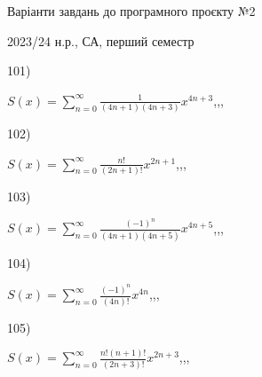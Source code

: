 \documentclass[11pt, ukrainian]{article}
\begin{document}
{\Large \center  Варіанти завдань до програмного проєкту №2\par 2023/24 н.р., СА, перший семестр\par \bigskip}

101) \space 
{%
{$S(x)=\sum\limits_{n=0}^{\infty}{\frac{1}{(4n+1)(4n+3)}}{x^{{4n+3}}}$},,, \par \smallskip  
}
\par
\vspace{0.9cm}
102) \space 
{%
{$S(x)=\sum\limits_{n=0}^{\infty}{\frac{n!}{(2n+1)!}}{x^{{2n+1}}}$},,, \par \smallskip  
}
\par
\vspace{0.9cm}
103) \space 
{%
{$S(x)=\sum\limits_{n=0}^{\infty}{\frac{(-1)^n}{(4n+1)(4n+5)}}{x^{{4n+5}}}$},,, \par \smallskip  
}
\par
\vspace{0.9cm}
104) \space 
{%
{$S(x)=\sum\limits_{n=0}^{\infty}{\frac{(-1)^n}{(4n)!}}{x^{{4n}}}$},,, \par \smallskip  
}
\par
\vspace{0.9cm}
105) \space 
{%
{$S(x)=\sum\limits_{n=0}^{\infty}{\frac{n!(n+1)!}{(2n+3)!}}{x^{{2n+3}}}$},,, \par \smallskip  
}
\par
\end{document}
